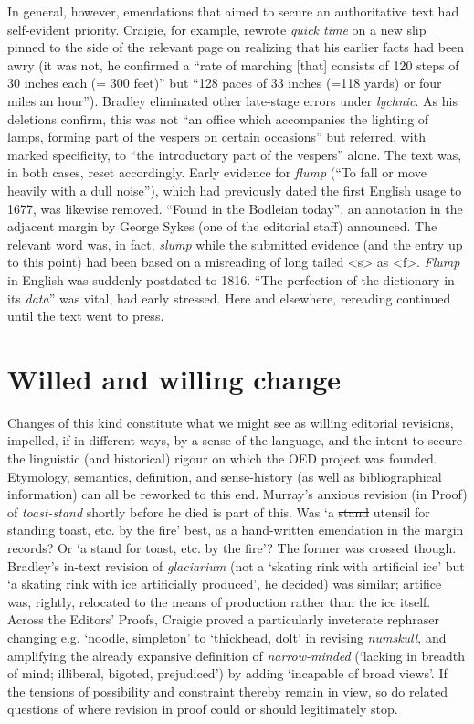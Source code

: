 \documentclass[output=paper,colorlinks,citecolor=brown,arabicfont,chinesefont]{langscibook}
\begin{document}
In general, however, emendations that aimed to secure an authoritative text had self-evident priority. Craigie, for example, rewrote \emph{quick time} on a new slip pinned to the side of the relevant page on realizing that his earlier facts had been awry (it was not, he confirmed a “rate of marching [that] consists of 120 steps of 30 inches each (= 300 feet)” but “128 paces of 33 inches (=118 yards) or four miles an hour”). Bradley eliminated other late-stage errors under \emph{lychnic}. As his deletions confirm, this was not “an office which accompanies the lighting of lamps, forming part of the vespers on certain occasions” but referred, with marked specificity, to “the introductory part of the vespers” alone. The text was, in both cases, reset accordingly. Early evidence for \emph{flump} (“To fall or move heavily with a dull noise”), which had previously dated the first English usage to 1677, was likewise removed. “Found in the Bodleian today”, an annotation in the adjacent margin by George Sykes (one of the editorial staff) announced. The relevant word was, in fact, \emph{slump} while the submitted evidence (and the entry up to this point) had been based on a misreading of long tailed <s> as <f>. \emph{Flump} in English was suddenly postdated to 1816. “The perfection of the dictionary in its \emph{data}” was vital, \citet[129]{Murray1880} had early stressed. Here and elsewhere, rereading continued until the text went to press.

\section{Willed and willing change}

Changes of this kind constitute what we might see as willing editorial revisions, impelled, if in different ways, by a sense of the language, and the intent to secure the linguistic (and historical) rigour on which the OED project was founded. Etymology, semantics, definition, and sense-history (as well as bibliographical information) can all be reworked to this end. Murray’s anxious revision (in Proof) of \emph{toast-stand} shortly before he died is part of this. Was ‘a \sout{stand} utensil for standing toast, etc. by the fire’ best, as a hand-written emendation in the margin records? Or ‘a stand for toast, etc. by the fire’? The former was crossed though. Bradley’s in-text revision of \emph{glaciarium} (not a ‘skating rink with artificial ice’ but ‘a skating rink with ice artificially produced’, he decided) was similar; artifice was, rightly, relocated to the means of production rather than the ice itself. Across the Editors’ Proofs, Craigie proved a particularly inveterate rephraser changing e.g. ‘noodle, simpleton’ to ‘thickhead, dolt’ in revising \emph{numskull}, and amplifying the already expansive definition of \emph{narrow-minded} (‘lacking in breadth of mind; illiberal, bigoted, prejudiced’) by adding ‘incapable of broad views’. If the tensions of possibility and constraint thereby remain in view, so do related questions of where revision in proof could or should legitimately stop.
\end{document}
